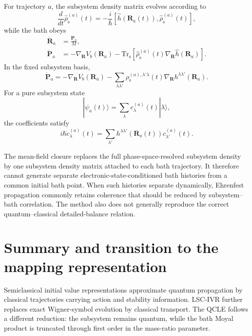 \documentclass[
  11pt,
  letterpaper,
  onehalfspacing,
  normalmargins,
  equalmargins,
  oneside
]{ut-thesis}
\begin{document}
For trajectory \(a\), the subsystem density matrix evolves according to
\begin{equation}
\frac{d}{dt}
\hat\rho_{\mathrm s}^{(a)}(t)
=
-
\frac{i}{\hbar}
\left[
\hat h(\mathbf R_a(t)),
\hat\rho_{\mathrm s}^{(a)}(t)
\right],
\label{eq:ehrenfest-subsystem-density-eom}
\end{equation}
while the bath obeys
\begin{align}
\dot{\mathbf R}_a
&=
\frac{\mathbf P_a}{M},
\label{eq:ehrenfest-rdot}
\\
\dot{\mathbf P}_a
&=
-
\nabla_{\mathbf R}V_b(\mathbf R_a)
-
\mathrm{Tr}_{\mathrm s}
\left[
\hat\rho_{\mathrm s}^{(a)}(t)
\nabla_{\mathbf R}
\hat h(\mathbf R_a)
\right].
\label{eq:ehrenfest-pdot}
\end{align}
In the fixed subsystem basis,
\begin{equation}
\dot{\mathbf P}_a
=
-
\nabla_{\mathbf R}V_b(\mathbf R_a)
-
\sum_{\lambda\lambda'}
\rho_{\mathrm s}^{(a),\lambda'\lambda}(t)
\nabla_{\mathbf R}
h^{\lambda\lambda'}(\mathbf R_a).
\label{eq:ehrenfest-force-density-matrix}
\end{equation}
For a pure subsystem state
\begin{equation}
|\psi_a(t)\rangle
=
\sum_\lambda
c_\lambda^{(a)}(t)
|\lambda\rangle,
\label{eq:ehrenfest-pure-subsystem-state}
\end{equation}
the coefficients satisfy
\begin{equation}
i\hbar
\dot c_\lambda^{(a)}(t)
=
\sum_{\lambda'}
h^{\lambda\lambda'}(\mathbf R_a(t))
c_{\lambda'}^{(a)}(t).
\label{eq:ehrenfest-coefficient-equation}
\end{equation}

The mean-field closure replaces the full phase-space-resolved subsystem
density by one subsystem density matrix attached to each bath trajectory. It
therefore cannot generate separate electronic-state-conditioned bath histories
from a common initial bath point.
When such histories separate dynamically, Ehrenfest propagation commonly
retains coherence that should be reduced by subsystem--bath correlation. The
method also does not generally reproduce the correct quantum--classical
detailed-balance relation.


\section{Summary and transition to the mapping representation}
\label{sec:summary-transition-mapping}

Semiclassical initial value representations approximate quantum propagation by
classical trajectories carrying action and stability information. LSC-IVR
further replaces exact Wigner-symbol evolution by classical transport. The
QCLE follows a different reduction: the subsystem remains quantum, while the
bath Moyal product is truncated through first order in the mass-ratio
parameter.
\end{document}
